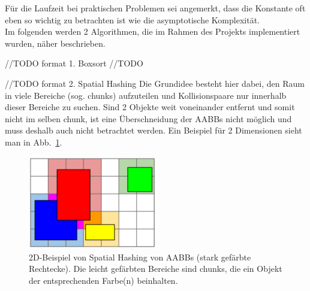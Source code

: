 Für die Laufzeit bei praktischen Problemen sei angemerkt, dass die Konstante oft eben so wichtig zu betrachten ist wie die asymptotische Komplexität. \\

Im folgenden werden 2 Algorithmen, die im Rahmen des Projekts implementiert wurden, näher beschrieben.

//TODO format
1. Boxsort
//TODO

//TODO format
2. Spatial Hashing
Die Grundidee besteht hier dabei, den Raum in viele Bereiche (sog. chunks) aufzuteilen und Kollisionspaare nur innerhalb dieser Bereiche zu suchen. Sind 2 Objekte weit voneinander entfernt und somit nicht im selben chunk, ist eine Überschneidung der AABBs nicht möglich und muss deshalb auch nicht betrachtet werden. Ein Beispiel für 2 Dimensionen sieht man in Abb.~\ref{fig:spatialHashing}.

\begin{figure}
    \centering
    \includegraphics[width=0.5\textwidth]{./res/spatialHashingAABB.png}
    \caption{2D-Beispiel von Spatial Hashing von AABBs (stark gefärbte Rechtecke). Die leicht gefärbten Bereiche sind chunks, die ein Objekt der entsprechenden Farbe(n) beinhalten.}
    \label{fig:spatialHashing}
\end{figure}


